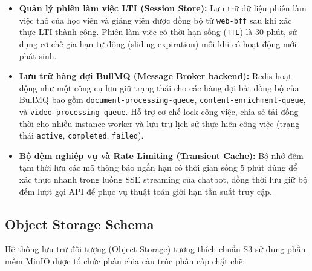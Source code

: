 \begin{itemize}
    \item \textbf{Quản lý phiên làm việc LTI (Session Store):} Lưu trữ dữ
          liệu phiên làm việc thô của học viên và giảng viên được đồng bộ
          từ \texttt{web-bff} sau khi xác thực LTI thành công. Phiên làm
          việc có thời hạn sống (\texttt{TTL}) là 30 phút, sử dụng cơ chế
          gia hạn tự động (sliding expiration) mỗi khi có hoạt động mới
          phát sinh.
    \item \textbf{Lưu trữ hàng đợi BullMQ (Message Broker backend):} Redis
          hoạt động như một công cụ lưu giữ trạng thái cho các hàng đợi
          bất đồng bộ của BullMQ bao gồm \texttt{document-processing-queue},
          \texttt{content-enrichment-queue}, và
          \texttt{video-processing-queue}. Hỗ trợ cơ chế lock công việc,
          chia sẻ tải đồng thời cho nhiều instance worker và lưu trữ lịch
          sử thực hiện công việc (trạng thái \texttt{active},
          \texttt{completed}, \texttt{failed}).
    \item \textbf{Bộ đệm nghiệp vụ và Rate Limiting (Transient Cache):} Bộ
          nhớ đệm tạm thời lưu các mã thông báo ngắn hạn có thời gian sống
          5 phút dùng để xác thực nhanh trong luồng SSE streaming của
          chatbot, đồng thời lưu giữ bộ đếm lượt gọi API để phục vụ thuật
          toán giới hạn tần suất truy cập.
\end{itemize}

\subsection{Object Storage Schema}

Hệ thống lưu trữ đối tượng (Object Storage) tương thích chuẩn S3 sử dụng
phần mềm MinIO được tổ chức phân chia cấu trúc phân cấp chặt chẽ:

